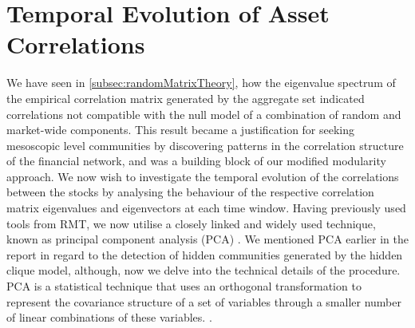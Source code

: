 
\section{Temporal Evolution of Asset Correlations}
\label{sec:temporalEvolutionAssetCorrelations}

We have seen in \cref{subsec:randomMatrixTheory}, how the eigenvalue spectrum of the empirical correlation matrix generated by the aggregate set indicated correlations not compatible with the null model of a combination of random and market-wide components.
This result became a justification for seeking mesoscopic level communities by discovering patterns in the correlation structure of the financial network, and was a building block of our modified modularity approach.
We now wish to investigate the temporal evolution of the correlations between the stocks by analysing the behaviour of the respective correlation matrix eigenvalues and eigenvectors at each time window.
Having previously used tools from RMT, we now utilise a closely linked and widely used technique, known as principal component analysis (PCA) \cite{FPW+11}.
We mentioned PCA earlier in the report in regard to the detection of hidden communities generated by the hidden clique model, although, now we delve into the technical details of the procedure.
PCA is a statistical technique that uses an orthogonal transformation to represent the covariance structure of a set of variables through a smaller number of linear combinations of these variables. \cite{Jol02,FPW+11,Gil14b}.

